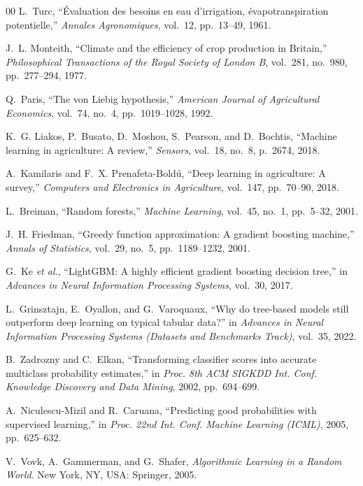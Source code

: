 \documentclass[conference]{IEEEtran}
\begin{document}
\begin{thebibliography}{00}
L.~Turc, ``\'{E}valuation des besoins en eau d'irrigation, \'{e}vapotranspiration potentielle,''
\emph{Annales Agronomiques}, vol.~12, pp.~13--49, 1961.

J.~L. Monteith, ``Climate and the efficiency of crop production in Britain,''
\emph{Philosophical Transactions of the Royal Society of London B}, vol.~281, no.~980,
pp.~277--294, 1977.

Q.~Paris, ``The von Liebig hypothesis,'' \emph{American Journal of Agricultural Economics},
vol.~74, no.~4, pp.~1019--1028, 1992.

K.~G. Liakos, P.~Busato, D.~Moshou, S.~Pearson, and D.~Bochtis, ``Machine learning in agriculture:
A review,'' \emph{Sensors}, vol.~18, no.~8, p.~2674, 2018.

A.~Kamilaris and F.~X. Prenafeta-Bold\'{u}, ``Deep learning in agriculture: A survey,''
\emph{Computers and Electronics in Agriculture}, vol.~147, pp.~70--90, 2018.

L.~Breiman, ``Random forests,'' \emph{Machine Learning}, vol.~45, no.~1, pp.~5--32, 2001.

J.~H. Friedman, ``Greedy function approximation: A gradient boosting machine,''
\emph{Annals of Statistics}, vol.~29, no.~5, pp.~1189--1232, 2001.

G.~Ke \emph{et al.}, ``LightGBM: A highly efficient gradient boosting decision tree,'' in
\emph{Advances in Neural Information Processing Systems}, vol.~30, 2017.

L.~Grinsztajn, E.~Oyallon, and G.~Varoquaux, ``Why do tree-based models still outperform deep
learning on typical tabular data?'' in \emph{Advances in Neural Information Processing Systems
(Datasets and Benchmarks Track)}, vol.~35, 2022.

B.~Zadrozny and C.~Elkan, ``Transforming classifier scores into accurate multiclass probability
estimates,'' in \emph{Proc. 8th ACM SIGKDD Int. Conf. Knowledge Discovery and Data Mining},
2002, pp.~694--699.

A.~Niculescu-Mizil and R.~Caruana, ``Predicting good probabilities with supervised learning,'' in
\emph{Proc. 22nd Int. Conf. Machine Learning (ICML)}, 2005, pp.~625--632.

V.~Vovk, A.~Gammerman, and G.~Shafer, \emph{Algorithmic Learning in a Random World}.
New York, NY, USA: Springer, 2005.


\end{thebibliography}
\end{document}
